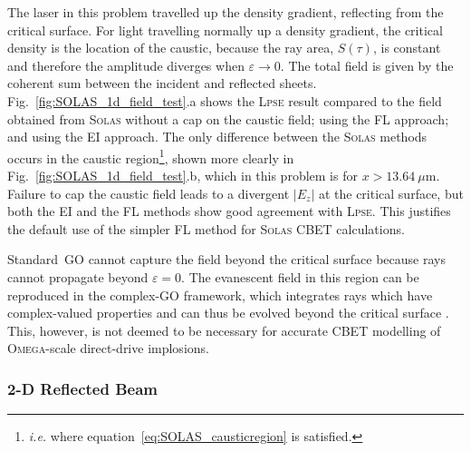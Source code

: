 The laser in this problem travelled up the density gradient, reflecting from the critical surface.
For light travelling normally up a density gradient, the critical density is the location of the caustic, because the ray area, $S(\tau)$, is constant and therefore the amplitude diverges when $\varepsilon\rightarrow 0$.
The total field is given by the coherent sum between the incident and reflected sheets.
Fig.~\ref{fig:SOLAS_1d_field_test}.a shows the \textsc{Lpse} result compared to the field obtained from \textsc{Solas} without a cap on the caustic field; using the \ac{FL} approach; and using the \ac{EI} approach.
The only difference between the \textsc{Solas} methods occurs in the caustic region\footnote{\textit{i.e.} where equation~\ref{eq:SOLAS_causticregion} is satisfied.}, shown more clearly in Fig.~\ref{fig:SOLAS_1d_field_test}.b, which in this problem is for $x>13.64\ \mu\text{m}$.
Failure to cap the caustic field leads to a divergent $|E_z|$ at the critical surface, but both the \ac{EI} and the \ac{FL} methods show good agreement with \textsc{Lpse}.
This justifies the default use of the simpler \ac{FL} method for \textsc{Solas} \ac{CBET} calculations.

Standard~\ac{GO} cannot capture the field beyond the critical surface because rays cannot propagate beyond $\varepsilon=0$.
The evanescent field in this region can be reproduced in the complex-\ac{GO} framework, which integrates rays which have complex-valued properties and can thus be evolved beyond the critical surface \cite{colaitis_real_2019}.
This, however, is not deemed to be necessary for accurate \ac{CBET} modelling of \textsc{Omega}-scale direct-drive implosions.

\subsubsection{2-D Reflected Beam}

